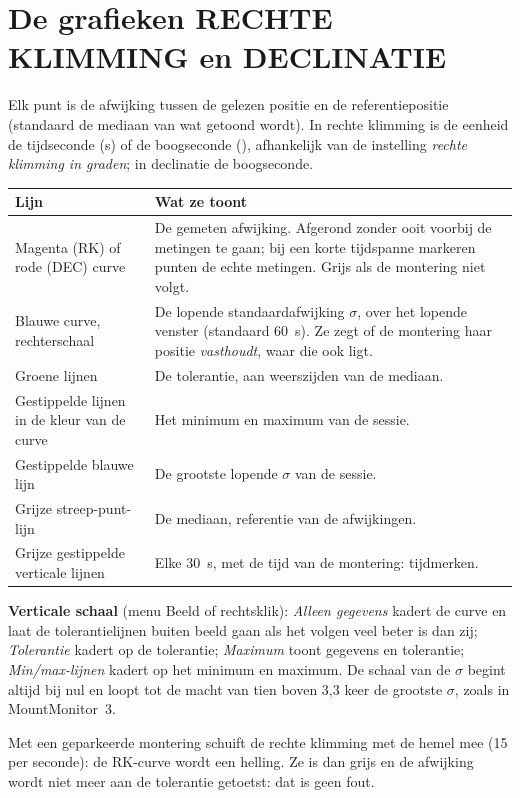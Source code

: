 \section{De grafieken RECHTE KLIMMING en DECLINATIE}
\label{sec:radec}

Elk punt is de afwijking tussen de gelezen positie en de referentiepositie
(standaard de mediaan van wat getoond wordt). In rechte klimming is de eenheid
de tijdseconde (s) of de boogseconde (\arcsec), afhankelijk van de instelling
\emph{rechte klimming in graden}; in declinatie de boogseconde.

\begin{center}
\begin{tabularx}{\textwidth}{lX}
\toprule
\textbf{Lijn} & \textbf{Wat ze toont} \\
\midrule
Magenta (RK) of rode (DEC) curve & De gemeten afwijking. Afgerond zonder ooit
voorbij de metingen te gaan; bij een korte tijdspanne markeren punten de echte
metingen. Grijs als de montering niet volgt. \\
Blauwe curve, rechterschaal & De lopende standaardafwijking $\sigma$, over het
lopende venster (standaard 60~s). Ze zegt of de montering haar positie
\emph{vasthoudt}, waar die ook ligt. \\
Groene lijnen & De tolerantie, aan weerszijden van de mediaan. \\
Gestippelde lijnen in de kleur van de curve & Het minimum en maximum van de
sessie. \\
Gestippelde blauwe lijn & De grootste lopende $\sigma$ van de sessie. \\
Grijze streep-punt-lijn & De mediaan, referentie van de afwijkingen. \\
Grijze gestippelde verticale lijnen & Elke 30~s, met de tijd van de montering:
tijdmerken. \\
\bottomrule
\end{tabularx}
\end{center}

\textbf{Verticale schaal} (menu Beeld of rechtsklik): \emph{Alleen gegevens}
kadert de curve en laat de tolerantielijnen buiten beeld gaan als het volgen
veel beter is dan zij; \emph{Tolerantie} kadert op de tolerantie;
\emph{Maximum} toont gegevens en tolerantie; \emph{Min/max-lijnen} kadert op het
minimum en maximum. De schaal van de $\sigma$ begint altijd bij nul en loopt tot
de macht van tien boven 3,3 keer de grootste $\sigma$, zoals in MountMonitor~3.

\begin{tip}
Met een geparkeerde montering schuift de rechte klimming met de hemel mee
(15\arcsec{} per seconde): de RK-curve wordt een helling. Ze is dan grijs en de
afwijking wordt niet meer aan de tolerantie getoetst: dat is geen fout.
\end{tip}

